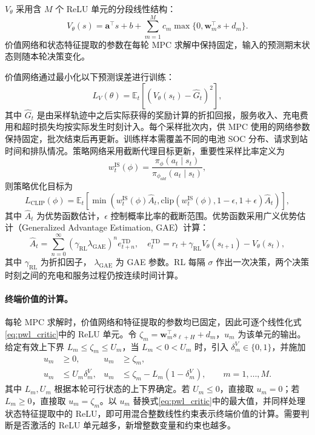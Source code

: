 \documentclass[12pt,a4paper,UTF8]{ctexart}
\begin{document}
$V_\theta$ 采用含 $M$ 个 ReLU 单元的分段线性结构：
\begin{equation}
V_\theta(s)
=\boldsymbol a^\top s+b
+\sum_{m=1}^{M}c_m
\max\{0,\boldsymbol w_m^\top s+d_m\}.
\label{eq:pwl_critic}
\end{equation}
价值网络和状态特征提取的参数在每轮 MPC 求解中保持固定，输入的预测期末状态则随本轮决策变化。

价值网络通过最小化以下预测误差进行训练：
\begin{equation}
L_V(\theta)=
\mathbb{E}_t\left[
\left(V_{\theta}(s_t)-\hat{G}_t\right)^2
\right],
\label{eq:value_loss}
\end{equation}
其中 $\hat{G}_t$ 是由采样轨迹中之后实际获得的奖励计算的折扣回报，服务收入、充电费用和超时损失均按实际发生时刻计入。每个采样批次内，供 MPC 使用的网络参数保持固定，批次结束后再更新。训练样本需覆盖不同的电池 SOC 分布、请求到站时间和排队情况。策略网络采用截断代理目标更新，重要性采样比率定义为
\begin{equation}
w_t^{\mathrm{IS}}(\phi)=
\frac{\pi_{\phi}(a_t\mid s_t)}{\pi_{\phi_{old}}(a_t\mid s_t)},
\label{eq:ppo_ratio}
\end{equation}
则策略优化目标为
\begin{equation}
L_{\mathrm{CLIP}}(\phi)=
\mathbb{E}_t\left[
\min\left(
w_t^{\mathrm{IS}}(\phi)\hat{A}_t,
\mathrm{clip}(w_t^{\mathrm{IS}}(\phi),1-\epsilon,1+\epsilon)\hat{A}_t
\right)
\right],
\label{eq:ppo_clip}
\end{equation}
其中 $\hat{A}_t$ 为优势函数估计，$\epsilon$ 控制概率比率的截断范围。优势函数采用广义优势估计（Generalized Advantage Estimation, GAE）计算：
\begin{equation}
\hat{A}_t=\sum_{n=0}^{\infty}
(\gamma_{\mathrm{RL}}\lambda_{\mathrm{GAE}})^n
e_{t+n}^{\mathrm{TD}},
\quad
e_t^{\mathrm{TD}}=r_t
+\gamma_{\mathrm{RL}}V_{\theta}(s_{t+1})-V_{\theta}(s_t),
\label{eq:gae}
\end{equation}
其中 $\gamma_{\mathrm{RL}}$ 为折扣因子，
$\lambda_{\mathrm{GAE}}$ 为 GAE 参数。RL 每隔 $\sigma$ 作出一次决策，两个决策时刻之间的充电和服务过程仍按连续时间计算。

\paragraph{终端价值的计算。}每轮 MPC 求解时，价值网络和特征提取的参数均已固定，因此可逐个线性化式\eqref{eq:pwl_critic}中的 ReLU 单元。令 $\zeta_m=\boldsymbol w_m^\top s_{\ell+H}+d_m$，$u_m$ 为该单元的输出。给定有效上下界 $L_m\le\zeta_m\le U_m$，当 $L_m<0<U_m$ 时，引入 $\delta_m^V\in\{0,1\}$，并施加
\begin{subequations}
\label{eq:pwl_critic_embedding}
\begin{align}
u_m&\ge0,& u_m&\ge\zeta_m,\\
u_m&\le U_m\delta_m^V,&
u_m&\le\zeta_m-L_m(1-\delta_m^V),
\qquad m=1,\ldots,M.
\end{align}
\end{subequations}
其中 $L_m,U_m$ 根据本轮可行状态的上下界确定。若 $U_m\le0$，直接取 $u_m=0$；若 $L_m\ge0$，直接取 $u_m=\zeta_m$。以 $u_m$ 替换式\eqref{eq:pwl_critic}中的最大值，并同样处理状态特征提取中的 ReLU，即可用混合整数线性约束表示终端价值的计算。需要判断是否激活的 ReLU 单元越多，新增整数变量和约束也越多。
\end{document}
